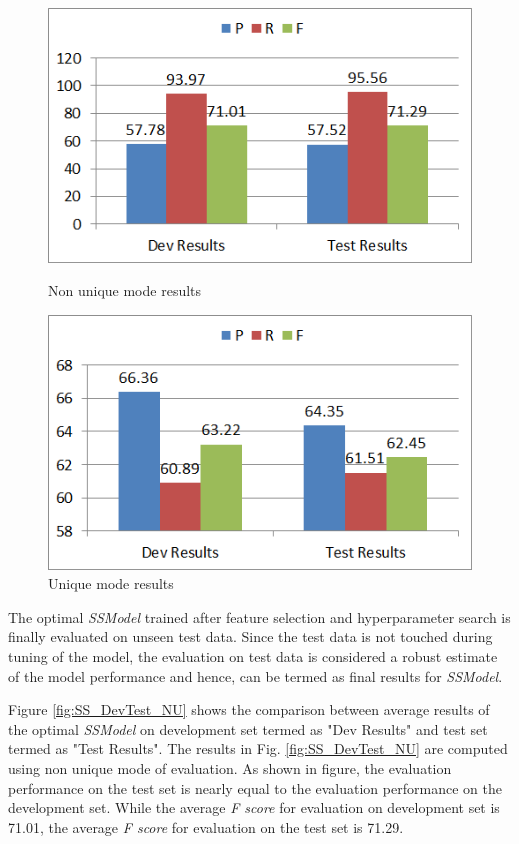 \begin{figure}
\centering
\begin{minipage}{.5\textwidth}
  \centering
  \includegraphics[width=.95\textwidth]{figures/CompDevTestResultsNonUniq.png}
  \caption{Non unique mode results}
  \label{fig:SS_DevTest_NU}
\end{minipage}%
\begin{minipage}{.5\textwidth}
  \centering
  \includegraphics[width=.95\textwidth]{figures/CompDevTestResultsUniq.png}
  \caption{Unique mode results}
  \label{fig:SS_DevTest_U}
\end{minipage}
\end{figure}

The optimal \textit{SSModel} trained after feature selection and hyperparameter search is finally evaluated on unseen test data. Since the test data is not touched during tuning of the model, the evaluation on test data is considered a robust estimate of the model performance and hence, can be termed as final results for \textit{SSModel}.

Figure \ref{fig:SS_DevTest_NU} shows the comparison between average results of the optimal \textit{SSModel} on development set termed as "Dev Results" and test set termed as "Test Results". The results in Fig. \ref{fig:SS_DevTest_NU} are computed using non unique mode of evaluation. As shown in figure, the evaluation performance on the test set is nearly equal to the evaluation performance on the development set. While the average \textit{F score} for evaluation on development set is 71.01, the average \textit{F score} for evaluation on the test set is 71.29.

